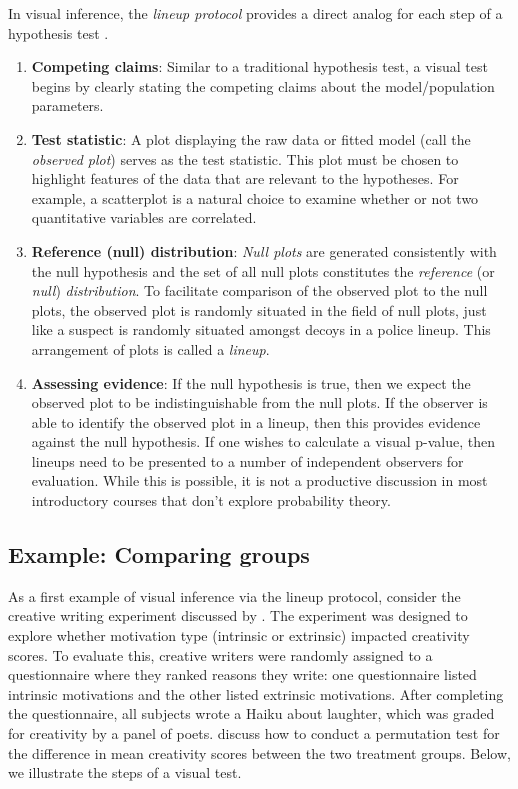 \documentclass[12pt]{article}
\begin{document}
In visual inference, the \emph{lineup protocol} provides a direct analog
for each step of a hypothesis test \citep{Buja-2009bd}.

\begin{enumerate}
\def\labelenumi{\arabic{enumi}.}
\item
  \textbf{Competing claims}: Similar to a traditional hypothesis test, a
  visual test begins by clearly stating the competing claims about the
  model/population parameters.
\item
  \textbf{Test statistic}: A plot displaying the raw data or fitted
  model (call the \emph{observed plot}) serves as the test statistic.
  This plot must be chosen to highlight features of the data that are
  relevant to the hypotheses. For example, a scatterplot is a natural
  choice to examine whether or not two quantitative variables are
  correlated.
\item
  \textbf{Reference (null) distribution}: \emph{Null plots} are
  generated consistently with the null hypothesis and the set of all
  null plots constitutes the \emph{reference} (or \emph{null})
  \emph{distribution}. To facilitate comparison of the observed plot to
  the null plots, the observed plot is randomly situated in the field of
  null plots, just like a suspect is randomly situated amongst decoys in
  a police lineup. This arrangement of plots is called a \emph{lineup}.
\item
  \textbf{Assessing evidence}: If the null hypothesis is true, then we
  expect the observed plot to be indistinguishable from the null plots.
  If the observer is able to identify the observed plot in a lineup,
  then this provides evidence against the null hypothesis. If one wishes
  to calculate a visual p-value, then lineups need to be presented to a
  number of independent observers for evaluation. While this is
  possible, it is not a productive discussion in most introductory
  courses that don't explore probability theory.
\end{enumerate}

\hypertarget{example-comparing-groups}{%
\subsection{Example: Comparing groups}\label{example-comparing-groups}}

As a first example of visual inference via the lineup protocol, consider
the creative writing experiment discussed by
\citep[pp.~2--14]{ramsey2013}. The experiment was designed to explore
whether motivation type (intrinsic or extrinsic) impacted creativity
scores. To evaluate this, creative writers were randomly assigned to a
questionnaire where they ranked reasons they write: one questionnaire
listed intrinsic motivations and the other listed extrinsic motivations.
After completing the questionnaire, all subjects wrote a Haiku about
laughter, which was graded for creativity by a panel of poets.
\citet{ramsey2013} discuss how to conduct a permutation test for the
difference in mean creativity scores between the two treatment groups.
Below, we illustrate the steps of a visual test.
\end{document}
